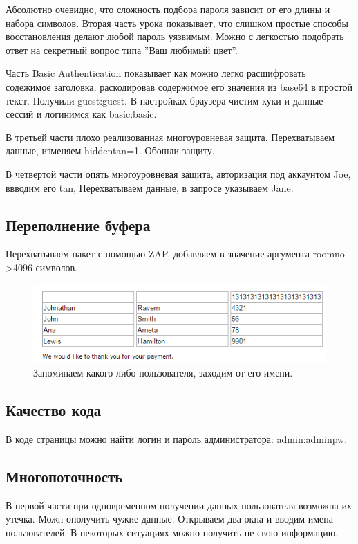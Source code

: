 \documentclass[a4paper, 14pt]{article}				%
\begin{document}
Абсолютно очевидно, что сложность подбора пароля зависит от его длины и набора символов.
Вторая часть урока показывает, что слишком простые способы восстановления делают любой пароль уязвимым. Можно с легкостью подобрать ответ на секретный вопрос типа ''Ваш любимый цвет''.

Часть Basic Authentication показывает как можно легко расшифровать содежимое заголовка, раскодировав содержимое его значения из base64 в простой текст. Получили guest:guest. В настройках браузера чистим куки и данные сессий и логинимся как basic:basic.

В третьей части плохо реализованная многоуровневая защита. Перехватываем данные, изменяем hiddentan=1. Обошли защиту.

В четвертой части опять многоуровневая защита, авторизация под аккаунтом Joe, ввводим его tan, Перехватываем данные, в запросе указываем Jane.

\subsection{Переполнение буфера}
Перехватываем пакет с помощью ZAP, добавляем в значение аргумента roomno >4096 символов.
\begin{figure}[h!]
\centering
\includegraphics[width=\textwidth]{rsrc/6_1}
\caption{Запоминаем какого-либо пользователя, заходим от его имени.}
\end{figure}

\subsection{Качество кода}
В коде страницы можно найти логин и пароль администратора: admin:adminpw.

\subsection{Многопоточность}
В первой части при одновременном получении данных пользователя возможна их утечка. Можн ополучить чужие данные. Открываем два окна и вводим имена пользователей. В некоторых ситуациях можно получить не свою информацию.
\end{document}
